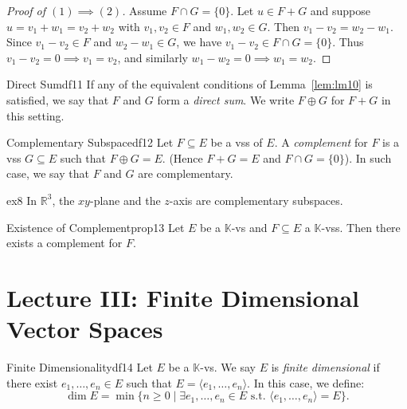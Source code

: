 \documentclass[11pt, a4paper]{article}
\newcommand{\R}{\mathbb{R}}
\newcommand{\K}{\mathbb{K}}
\begin{document}
\begin{proof}[Proof of $(1) \implies (2)$]
  Assume $F \cap G = \{0\}$. Let $u \in F + G$ and suppose $u = v_1 + w_1 = v_2 + w_2$ with $v_1, v_2 \in F$ and $w_1, w_2 \in G$.
  Then $v_1 - v_2 = w_2 - w_1$.
  Since $v_1 - v_2 \in F$ and $w_2 - w_1 \in G$, we have $v_1 - v_2 \in F \cap G = \{0\}$.
  Thus $v_1 - v_2 = 0 \implies v_1 = v_2$, and similarly $w_1 - w_2 = 0 \implies w_1 = w_2$.
\end{proof}

\begin{definition}{Direct Sum}{df11}
  If any of the equivalent conditions of Lemma~\ref{lem:lm10} is satisfied, we say that $F$ and $G$ form a \emph{direct sum}. We write $F \oplus G$ for $F + G$ in this setting.
\end{definition}

\begin{definition}{Complementary Subspace}{df12}
  Let $F \subseteq E$ be a vss of $E$. A \emph{complement} for $F$ is a vss $G \subseteq E$ such that $F \oplus G = E$. (Hence $F + G = E$ and $F \cap G = \{0\}$).
  In such case, we say that $F$ and $G$ are complementary.
\end{definition}

\begin{example}{}{ex8}
  In $\R^3$, the $xy$-plane and the $z$-axis are complementary subspaces.
\end{example}

\begin{proposition}{Existence of Complement}{prop13}
  Let $E$ be a $\K$-vs and $F \subseteq E$ a $\K$-vss. Then there exists a complement for $F$.
\end{proposition}

\section{Lecture III: Finite Dimensional Vector Spaces}

\begin{definition}{Finite Dimensionality}{df14}
  Let $E$ be a $\K$-vs. We say $E$ is \emph{finite dimensional} if there exist $e_1, \dots, e_n \in E$ such that $E = \langle e_1, \dots, e_n \rangle$.
  In this case, we define:
  \[
    \dim E = \min \{ n \ge 0 \mid \exists e_1, \dots, e_n \in E \text{ s.t. } \langle e_1, \dots, e_n \rangle = E \}.
  \]
\end{definition}
\end{document}
